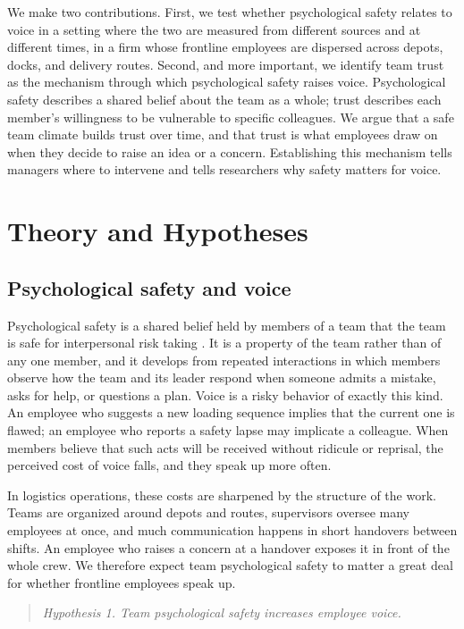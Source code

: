\documentclass[11pt]{article}
\begin{document}
We make two contributions. First, we test whether psychological safety relates to voice in a setting where the two are measured from different sources and at different times, in a firm whose frontline employees are dispersed across depots, docks, and delivery routes. Second, and more important, we identify team trust as the mechanism through which psychological safety raises voice. Psychological safety describes a shared belief about the team as a whole; trust describes each member's willingness to be vulnerable to specific colleagues. We argue that a safe team climate builds trust over time, and that trust is what employees draw on when they decide to raise an idea or a concern. Establishing this mechanism tells managers where to intervene and tells researchers why safety matters for voice.

\section{Theory and Hypotheses}

\subsection{Psychological safety and voice}

Psychological safety is a shared belief held by members of a team that the team is safe for interpersonal risk taking \citep{harlow2009}. It is a property of the team rather than of any one member, and it develops from repeated interactions in which members observe how the team and its leader respond when someone admits a mistake, asks for help, or questions a plan. Voice is a risky behavior of exactly this kind. An employee who suggests a new loading sequence implies that the current one is flawed; an employee who reports a safety lapse may implicate a colleague. When members believe that such acts will be received without ridicule or reprisal, the perceived cost of voice falls, and they speak up more often.

In logistics operations, these costs are sharpened by the structure of the work. Teams are organized around depots and routes, supervisors oversee many employees at once, and much communication happens in short handovers between shifts. An employee who raises a concern at a handover exposes it in front of the whole crew. We therefore expect team psychological safety to matter a great deal for whether frontline employees speak up.

\begin{quote}
\textit{Hypothesis 1. Team psychological safety increases employee voice.}
\end{quote}
\end{document}
